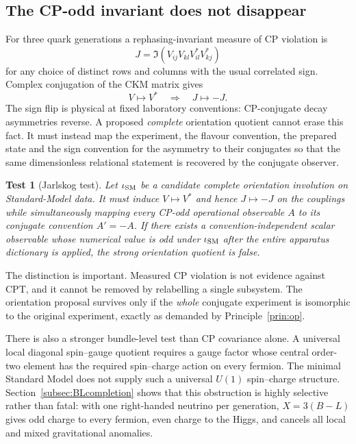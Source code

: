 \documentclass[11pt]{article}
\newtheorem{test}[theorem]{Test}
\theoremstyle{definition}\newtheorem{definition}[theorem]{Definition}
\theoremstyle{remark}\newtheorem{remark}[theorem]{Remark}\newtheorem{conjecture}[theorem]{Conjecture}
\begin{document}
\subsection{The CP-odd invariant does not disappear}
For three quark generations a rephasing-invariant measure of CP violation is~\cite{Jarlskog1985,PDGCP2024}
\begin{equation}\label{eq:J}
 J=\Im\!\left(V_{ij}V_{kl}V^*_{il}V^*_{kj}\right)
\end{equation}
for any choice of distinct rows and columns with the usual correlated sign. Complex conjugation of the CKM matrix gives
\begin{equation}\label{eq:Jflip}
 V\mapsto V^*\quad\Longrightarrow\quad J\mapsto-J.
\end{equation}
The sign flip is physical at fixed laboratory conventions: CP-conjugate decay asymmetries reverse. A proposed \emph{complete} orientation quotient cannot erase this fact. It must instead map the experiment, the flavour convention, the prepared state and the sign convention for the asymmetry to their conjugates so that the same dimensionless relational statement is recovered by the conjugate observer.

\begin{test}[Jarlskog test]\label{test:J}
Let $\iota_{\rm SM}$ be a candidate complete orientation involution on Standard-Model data. It must induce $V\mapsto V^*$ and hence $J\mapsto-J$ on the couplings while simultaneously mapping every CP-odd operational observable $A$ to its conjugate convention $A'=-A$. If there exists a convention-independent scalar observable whose numerical value is odd under $\iota_{\rm SM}$ after the entire apparatus dictionary is applied, the strong orientation quotient is false.
\end{test}

The distinction is important. Measured CP violation is not evidence against CPT, and it cannot be removed by relabelling a single subsystem. The orientation proposal survives only if the \emph{whole} conjugate experiment is isomorphic to the original experiment, exactly as demanded by Principle~\ref{prin:op}.

There is also a stronger bundle-level test than CP covariance alone. A universal local diagonal spin--gauge quotient requires a gauge factor whose central order-two element has the required spin--charge action on every fermion. The minimal Standard Model does not supply such a universal $U(1)$ spin--charge structure. Section~\ref{subsec:BLcompletion} shows that this obstruction is highly selective rather than fatal: with one right-handed neutrino per generation, $X=3(B-L)$ gives odd charge to every fermion, even charge to the Higgs, and cancels all local and mixed gravitational anomalies.
\end{document}
